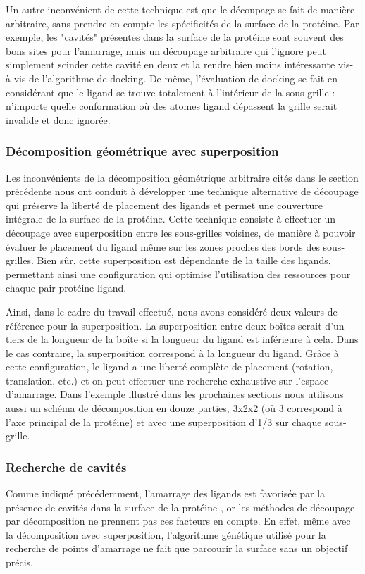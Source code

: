 Un autre inconvénient de cette technique est que le découpage se fait de manière arbitraire, sans prendre en compte les spécificités de la surface de la protéine. Par exemple, les "cavités" présentes dans la surface de la protéine sont souvent des bons sites pour l'amarrage, mais un découpage arbitraire qui l'ignore peut simplement scinder cette cavité en deux et la rendre bien moins intéressante vis-à-vis de l'algorithme de docking. De même, l'évaluation de docking se fait en considérant que le ligand se trouve totalement à l'intérieur de la sous-grille : n'importe quelle conformation où des atomes ligand dépassent la grille serait invalide et donc ignorée. 

\subsubsection{Décomposition géométrique avec superposition}
Les inconvénients de la décomposition géométrique arbitraire cités dans le section précédente nous ont conduit à développer une technique alternative de découpage qui préserve la liberté de placement des ligands et permet une couverture intégrale de la surface de la protéine. Cette technique consiste à effectuer un découpage avec superposition entre les sous-grilles voisines, de manière à pouvoir évaluer le placement du ligand même sur les zones proches des bords des sous-grilles. Bien sûr, cette superposition est dépendante de la taille des ligands, permettant ainsi une configuration qui optimise l'utilisation des ressources pour chaque pair protéine-ligand. 

Ainsi, dans le cadre du travail effectué, nous avons considéré deux valeurs de référence pour la superposition. La superposition entre deux boîtes serait d'un tiers de la longueur de la boîte si la longueur du ligand est inférieure à cela. Dans le cas contraire, la superposition correspond à la longueur du ligand. Grâce à cette configuration, le ligand a une liberté complète de placement (rotation, translation, etc.) et on peut effectuer une recherche exhaustive sur l'espace d'amarrage. Dans l'exemple illustré dans les prochaines sections nous utilisons aussi un schéma de décomposition en douze parties, 3x2x2 (où 3 correspond à l'axe principal de la protéine) et avec une superposition d'1/3 sur chaque sous-grille. 

\subsubsection{Recherche de cavités}
Comme indiqué précédemment, l'amarrage des ligands est favorisée par la présence de cavités dans la surface de la protéine \cite{Ghersi2009,Hetenyi2011}, or les méthodes de découpage par décomposition ne prennent pas ces facteurs en compte. En effet, même avec la décomposition avec superposition, l'algorithme génétique utilisé pour la recherche de points d'amarrage ne fait que parcourir la surface sans un objectif précis. 

